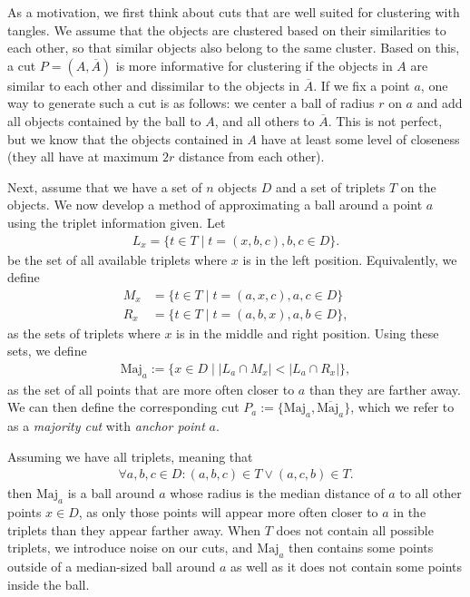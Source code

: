 As a motivation, we first think about cuts that are well suited for clustering with tangles.
We assume that the objects are clustered based on their similarities to each other, so that 
similar objects also belong to the same cluster. Based on this, a cut $P = \left(   A, \overline{A} \right) $ is more informative for clustering if the objects in $A$ are similar to each other and
dissimilar to the objects in $\overline{A}$. If we fix a point $a$, one way
to generate such a cut is as follows: 
we center a ball of radius $r$ on $a$ and add all objects contained by the ball to $A$, 
and all others to $\overline{A}$. This is not perfect, but we know that the objects
contained in $A$ have at least some level of closeness (they all have 
at maximum $2r$ distance from each other). 

Next, assume that we have a set of $n$ objects $D$ and a set of triplets $T$ on the
objects. We now develop a method of approximating a ball around a point $a$ using the
triplet information given. Let 
\begin{align*}
L_x = \{t \in T  \mid  t = (x, b,c), b,c \in D\} 
.\end{align*}
be the set of all available triplets where $x$ is in the left position. Equivalently, 
we define 
\begin{align*}
    M_x &=  \{t \in T  \mid  t = (a, x, c), a,c \in D\} \\
    R_x &=  \{t \in T  \mid  t = (a, b, x), a,b \in D\} 
,\end{align*}
as the sets of triplets where $x$ is in the middle and right position. 
Using these sets, we define  
\begin{align*}
    \text{Maj} _a := \{x \in D \mid \left| L_a \cap M_x\right| < \left| L_a \cap R_x \right| \}
,\end{align*}
as the set of all points that are more often closer to $a$ than they are farther away. 
We can then define the corresponding cut $P_a := \{ \text{Maj}_a, \overline{\text{Maj}_a } \}$, which
we refer to as a \textit{majority cut} with \textit{anchor point} $a$.

Assuming we have all triplets, meaning that 
\begin{align*}
    \forall a,b,c \in D: (a,b,c) \in T \vee (a,c,b) \in T
.\end{align*}
then $\text{Maj}_a$ is a ball around $a$ whose radius is the median distance of $a$ to all other points $x \in D$, as only those points will appear more often closer to $a$ in the triplets
than they appear farther away. When $T$ does not contain all possible triplets, we introduce 
noise on our cuts, and $\text{Maj}_a$ then contains some points outside of a median-sized ball
around $a$ as well as it does not contain some points inside the ball.

